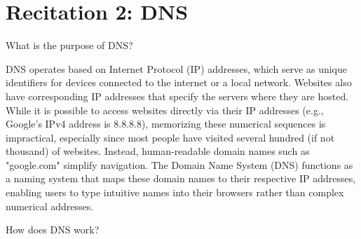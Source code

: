 \documentclass[a4paper]{article}
\begin{document}
\section*{Recitation 2: DNS}

\begin{Exercise}
    What is the purpose of DNS? 
\end{Exercise}

\begin{Solution}
    DNS operates based on Internet Protocol (IP) addresses, which serve as unique identifiers for devices connected to the internet or a local network. Websites also have corresponding IP addresses that specify the servers where they are hosted. While it is possible to access websites directly via their IP addresses (e.g., Google's IPv4 address is 8.8.8.8), memorizing these numerical sequences is impractical, especially since most people have visited several hundred (if not thousand) of websites. Instead, human-readable domain names such as "google.com" simplify navigation. The Domain Name System (DNS) functions as a naming system that maps these domain names to their respective IP addresses, enabling users to type intuitive names into their browsers rather than complex numerical addresses.
\end{Solution}

\begin{Exercise}
    How does DNS work?
\end{Exercise}
\end{document}
